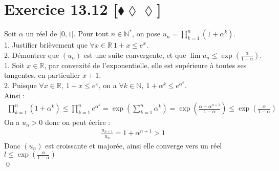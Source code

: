 \documentclass[10pt]{article}
\begin{document}
\section*{Exercice 13.12 [$\blacklozenge\lozenge\lozenge$]}
\begin{tcolorbox}[enhanced, width=7.6in, center, size=fbox, fontupper=\large, drop shadow southwest]
    Soit $\alpha$ un réel de $]0,1[$. Pour tout $n\in\mathbb{N}^*$, on pose $u_n=\prod_{k=1}^n(1+\alpha^k)$.\\
    1. Justifier brièvement que $\forall x \in \mathbb{R} ~ 1 + x \leq e^x$.\\
    2. Démontrer que $(u_n)$ est une suite convergente, et que $\lim u_n \leq \exp(\frac{\alpha}{1-\alpha})$.\\[0.1cm]
    1. Soit $x\in\mathbb{R}$, par convexité de l'exponentielle, elle est supérieure à toutes ses tangentes, en particulier $x+1$.\\
    2. Puisque $\forall x\in\mathbb{R}, ~ 1 + x \leq e^x$, on a $\forall k\in\mathbb{N}, ~ 1 + \alpha^k \leq e^{\alpha^k}$.\\
    Ainsi :
    \begin{align*}
        \prod_{k=1}^n(1+\alpha^k) \leq \prod_{k=1}^ne^{\alpha^k}=\exp(\sum_{k=1}^n{\alpha^k})=\exp(\frac{\alpha-\alpha^{n+1}}{1-\alpha})\leq\exp\left( \frac{\alpha}{1-\alpha} \right)
    \end{align*}
    On a $u_n>0$ donc on peut écrire :
    \begin{align*}
        \frac{u_{n+1}}{u_n} = 1+\alpha^{n+1} > 1
    \end{align*}
    Donc $(u_n)$ est croissante et majorée, ainsi elle converge vers un réel $l \leq \exp(\frac{\alpha}{1-\alpha})$\\
    \qed
\end{tcolorbox}
\end{document}
